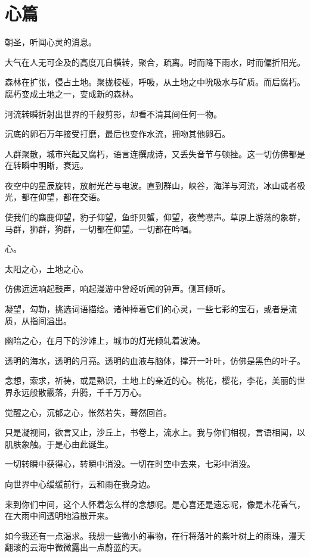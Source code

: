 \documentclass[UTF8]{article}
\begin{document}
\section{心篇}
\par 朝圣，听闻心灵的消息。
\par 大气在人无可企及的高度兀自横转，聚合，疏离。时而降下雨水，时而偏折阳光。
\par 森林在扩张，侵占土地。聚拢枝桠，呼吸，从土地之中吮吸水与矿质。而后腐朽。腐朽变成土地之一，变成新的森林。
\par 河流转瞬折射出世界的千般剪影，却看不清其间任何一物。
\par 沉底的卵石万年接受打磨，最后也变作水流，拥吻其他卵石。
\par 人群聚散，城市兴起又腐朽，语言连撰成诗，又丢失音节与顿挫。这一切仿佛都是在转瞬中明晰，衰远。
\par 夜空中的星辰旋转，放射光芒与电波。直到群山，峡谷，海洋与河流，冰山或者极光，都在仰望，都在交语。
\par 使我们的麋鹿仰望，豹子仰望，鱼虾贝蟹，仰望，夜莺噤声。草原上游荡的象群，马群，狮群，狗群，一切都在仰望。一切都在吟唱。
\par 心。
\par 太阳之心，土地之心。
\par 仿佛远远响起鼓声，响起漫游中曾经听闻的钟声。侧耳倾听。
\par 凝望，勾勒，挑选词语描绘。诸神捧着它们的心灵，一些七彩的宝石，或者是流质，从指间溢出。
\par 幽暗之心，在月下的沙滩上，城市的灯光倾轧着波涛。
\par 透明的海水，透明的月亮。透明的血液与脑体，撑开一叶叶，仿佛是黑色的叶子。
\par 念想，索求，祈祷，或是熟识，土地上的亲近的心。桃花，樱花，李花，美丽的世界永远般散霰落，升腾，千千万万心。
\par 觉醒之心，沉郁之心，怅然若失，蓦然回首。
\par 只是凝视间，欲言又止，沙丘上，书卷上，流水上。我与你们相视，言语相闻，以肌肤象触。于是心由此诞生。
\par 一切转瞬中获得心，转瞬中消没。一切在时空中去来，七彩中消没。
\\[0.6cm]
\par 向世界中心缓缓前行，云和雨在我身边。
\par 来到你们中间，这个人怀着怎么样的念想呢。是心喜还是遗忘呢，像是木花香气，在大雨中间透明地溢散开来。
\par 如今我还有一点渴求。我想一些微小的事物，在行将落叶的紫叶树上的雨珠，漫天翻滚的云海中微微露出一点蔚蓝的天。
\end{document}
